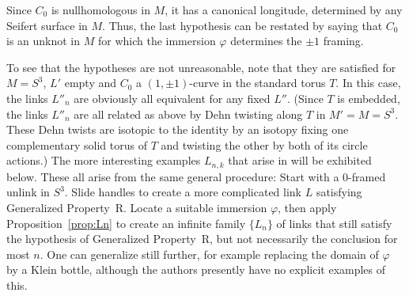 \documentclass{amsart}
\begin{document}
\noindent Since $C_0$ is nullhomologous in $M$, it has a canonical longitude, determined by any Seifert surface in $M$. Thus, the last hypothesis can be restated by saying that $C_0$ is an unknot in $M$ for which the immersion $\varphi$ determines the $\pm 1$ framing.

To see that the hypotheses are not unreasonable, note that they are satisfied for $M=S^3$, $L'$ empty and $C_0$ a $(1,\pm 1)$-curve in the standard torus $T$. In this case, the links $L''_n$ are obviously all equivalent for any fixed $L''$. (Since $T$ is embedded, the links $L''_n$ are all related as above by Dehn twisting along $T$ in $M'=M=S^3$. These Dehn twists are isotopic to the identity by an isotopy fixing one complementary solid torus of $T$ and twisting the other by both of its circle actions.) The more interesting examples $L_{n,k}$ that arise in \cite{Go1} will be exhibited below. These all arise from the same general procedure: Start with a 0-framed unlink in $S^3$. Slide handles to create a more complicated link $L$ satisfying Generalized Property~R. Locate a suitable immersion $\varphi$, then apply Proposition~\ref{prop:Ln} to create an infinite family $\{L_n\}$ of links that still satisfy the hypothesis of Generalized Property~R, but not necessarily the conclusion for most $n$. One can generalize still further, for example replacing the domain of $\varphi$ by a Klein bottle, although the authors presently have no explicit examples of this.
\end{document}
